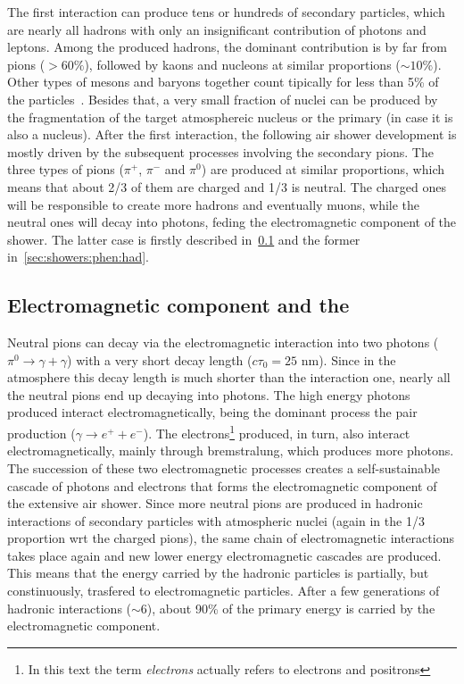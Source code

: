 The first interaction can produce tens or hundreds of
secondary particles, which are nearly all hadrons
with only an insignificant contribution of photons and leptons.
Among the produced hadrons, the dominant contribution is by far from pions ($>60\%$),
followed by kaons and nucleons at similar proportions ($\sim 10\%$). Other
types of mesons and baryons together count tipically for less than 5\% of
the particles~\cite{Calcagni:2017tws}.
Besides that, a very small fraction of nuclei can be produced
by the fragmentation of the target atmosphereic nucleus or the primary (in case it is also a nucleus).
After the first interaction, the following air shower development is mostly driven
by the subsequent processes involving the secondary pions.
The three types of pions ($\pi^+$, $\pi^-$ and $\pi^0$)
are produced at similar proportions, which means that about 2/3 of them are charged and
1/3 is neutral. The charged ones will be responsible to create more
hadrons and eventually muons, while the neutral ones will decay into photons,
feding the electromagnetic component of the shower.
The latter case is firstly described in~\cref{sec:showers:phen:em}
and the former in~\cref{sec:showers:phen:had}. 

\subsection[Electromagnetic component and the \xmax]{\boldmath Electromagnetic component and the \xmax}
\label{sec:showers:phen:em}


Neutral pions can decay via the electromagnetic interaction
into two photons ($\pi^0\rightarrow \gamma+\gamma$)
with a very short decay length ($c\tau_0=25$ nm). Since in the atmosphere this decay length
is much shorter than the interaction one, nearly all the neutral pions end up decaying into
photons. The high energy photons produced interact electromagnetically, being the dominant
process the pair production ($\gamma\rightarrow e^++e^-$).
The electrons\footnote{In this text the term \emph{electrons} actually refers to electrons and positrons} 
produced, in turn, also interact electromagnetically, mainly through bremstralung, which
produces more photons. The succession of these two electromagnetic processes
creates a self-sustainable cascade of photons and electrons
that forms the electromagnetic component of the extensive air shower.
Since more neutral pions are produced in hadronic interactions of secondary
particles with atmospheric nuclei (again in the 1/3 proportion wrt the charged pions),
the same chain of electromagnetic interactions takes place again
and new lower energy electromagnetic cascades are produced.
This means that the energy carried by the hadronic particles
is partially, but constinuously, trasfered to electromagnetic particles.
After a few generations of hadronic interactions ($\sim 6$), about 90\% of
the primary energy is carried by the electromagnetic component.


